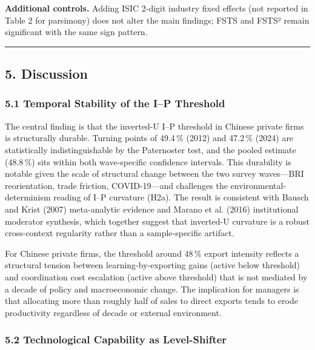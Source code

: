 \documentclass[12pt,a4paper]{article}
\begin{document}
\textbf{Additional controls.} Adding ISIC 2-digit industry fixed effects
(not reported in Table 2 for parsimony) does not alter the main
findings; FSTS and FSTS² remain significant with the same sign pattern.

\begin{center}\rule{0.5\linewidth}{0.5pt}\end{center}

\hypertarget{5-discussion}{%
\subsection{5. Discussion}\label{5-discussion}}

\hypertarget{51-temporal-stability-of-the-ip-threshold}{%
\subsubsection{5.1 Temporal Stability of the I--P
Threshold}\label{51-temporal-stability-of-the-ip-threshold}}

The central finding is that the inverted-U I--P threshold in Chinese
private firms is structurally durable. Turning points of 49.4\,\% (2012)
and 47.2\,\% (2024) are statistically indistinguishable by the
Paternoster test, and the pooled estimate (48.8\,\%) sits within both
wave-specific confidence intervals. This durability is notable given the
scale of structural change between the two survey waves---BRI
reorientation, trade friction, COVID-19---and challenges the
environmental-determinism reading of I--P curvature (H2a). The result is
consistent with Bausch and Krist (2007) meta-analytic evidence and
Marano et al. (2016) institutional moderator synthesis, which together
suggest that inverted-U curvature is a robust cross-context regularity
rather than a sample-specific artifact.

For Chinese private firms, the threshold around 48\,\% export intensity
reflects a structural tension between learning-by-exporting gains
(active below threshold) and coordination cost escalation (active above
threshold) that is not mediated by a decade of policy and macroeconomic
change. The implication for managers is that allocating more than
roughly half of sales to direct exports tends to erode productivity
regardless of decade or external environment.

\hypertarget{52-technological-capability-as-level-shifter}{%
\subsubsection{5.2 Technological Capability as
Level-Shifter}\label{52-technological-capability-as-level-shifter}}
\end{document}

